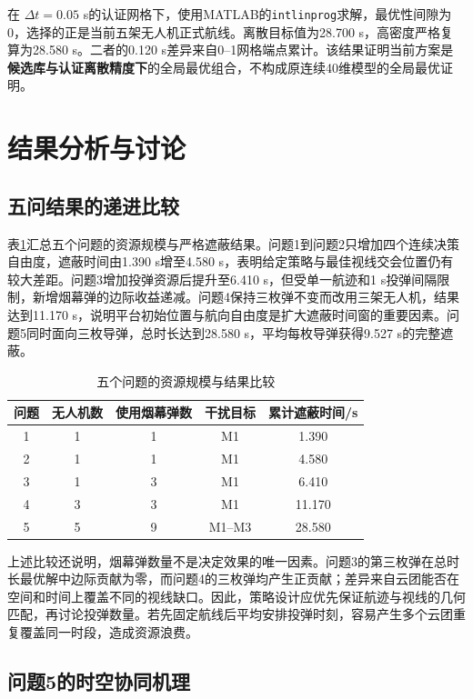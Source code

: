 \documentclass[12pt,a4paper]{ctexart}
\begin{document}
在 $\Delta t=0.05$ s的认证网格下，使用MATLAB的\texttt{intlinprog}求解\cite{matlab}，最优性间隙为0，选择的正是当前五架无人机正式航线。离散目标值为28.700 s，高密度严格复算为28.580 s。二者的0.120 s差异来自0--1网格端点累计。该结果证明当前方案是\textbf{候选库与认证离散精度下}的全局最优组合，不构成原连续40维模型的全局最优证明。

\section{结果分析与讨论}

\subsection{五问结果的递进比较}

表\ref{tab:progress}汇总五个问题的资源规模与严格遮蔽结果。问题1到问题2只增加四个连续决策自由度，遮蔽时间由1.390 s增至4.580 s，表明给定策略与最佳视线交会位置仍有较大差距。问题3增加投弹资源后提升至6.410 s，但受单一航迹和1 s投弹间隔限制，新增烟幕弹的边际收益递减。问题4保持三枚弹不变而改用三架无人机，结果达到11.170 s，说明平台初始位置与航向自由度是扩大遮蔽时间窗的重要因素。问题5同时面向三枚导弹，总时长达到28.580 s，平均每枚导弹获得9.527 s的完整遮蔽。

\begin{table}[H]
\centering
\caption{五个问题的资源规模与结果比较}
\label{tab:progress}
\begin{tabular}{ccccc}
\toprule
问题 & 无人机数 & 使用烟幕弹数 & 干扰目标 & 累计遮蔽时间/s\\
\midrule
1 & 1 & 1 & M1 & 1.390\\
2 & 1 & 1 & M1 & 4.580\\
3 & 1 & 3 & M1 & 6.410\\
4 & 3 & 3 & M1 & 11.170\\
5 & 5 & 9 & M1--M3 & 28.580\\
\bottomrule
\end{tabular}
\end{table}

上述比较还说明，烟幕弹数量不是决定效果的唯一因素。问题3的第三枚弹在总时长最优解中边际贡献为零，而问题4的三枚弹均产生正贡献；差异来自云团能否在空间和时间上覆盖不同的视线缺口。因此，策略设计应优先保证航迹与视线的几何匹配，再讨论投弹数量。若先固定航线后平均安排投弹时刻，容易产生多个云团重复覆盖同一时段，造成资源浪费。

\subsection{问题5的时空协同机理}
\end{document}
